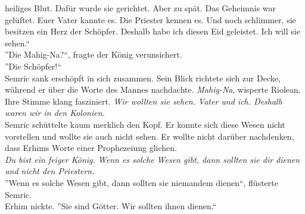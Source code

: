 heiliges Blut. Dafür wurde sie gerichtet. Aber zu spät. Das Geheimnis war gelüftet. Euer Vater 
kannte es. Die Priester kennen es. Und noch schlimmer, sie besitzen ein Herz der Schöpfer. Deshalb 
habe ich diesen Eid geleistet. Ich will sie sehen.``\\
''Die Mahig-Na?``, fragte der König verunsichert.\\
''Die Schöpfer!``\\
Semric sank erschöpft in sich zusammen. Sein Blick richtete sich zur Decke, während er über die 
Worte des Mannes nachdachte. \textit{Mahig-Na}, wisperte Riolean. Ihre Stimme klang fasziniert. 
\textit{Wir wollten sie sehen. Vater und ich. Deshalb waren wir in den Kolonien.}\\
Semric schüttelte kaum merklich den Kopf. Er konnte sich diese Wesen nicht vorstellen und wollte 
sie auch nicht sehen. Er wollte nicht darüber nachdenken, dass Erhims Worte einer Prophezeiung 
glichen.\\
\textit{Du bist ein feiger König. Wenn es solche Wesen gibt, dann sollten sie dir dienen und nicht 
den Priestern.}\\
''Wenn es solche Wesen gibt, dann sollten sie niemandem dienen``, flüsterte Semric.\\
Erhim nickte. ''Sie sind Götter. Wir sollten ihnen dienen.``\\

